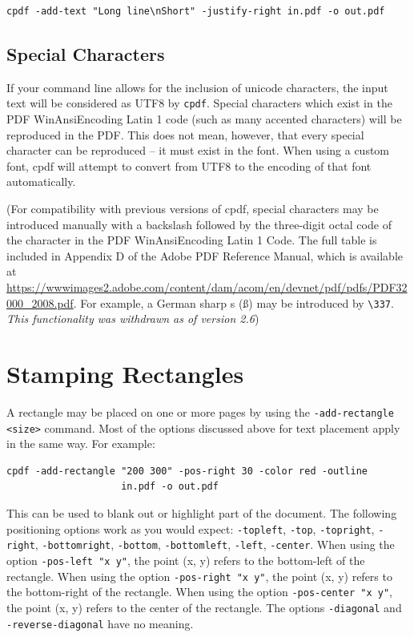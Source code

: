 \documentclass{book}
\begin{document}
\begin{framed}
  \noindent\small\begin{verbatim}cpdf -add-text "Long line\nShort" -justify-right in.pdf -o out.pdf\end{verbatim}
\end{framed}

\subsection{Special Characters}

If your command line allows for the inclusion of unicode characters, the input
text will be considered as UTF8 by \verb!cpdf!. Special characters which exist
in the PDF WinAnsiEncoding Latin 1 code (such as many accented characters) will
be reproduced in the PDF. This does not mean, however, that every special
character can be reproduced -- it must exist in the font. When using a custom font, cpdf will attempt to convert from UTF8 to the encoding of that font automatically.

(For compatibility with previous versions of cpdf, special characters may be
introduced manually with a backslash followed by the three-digit octal code of
the character in the PDF WinAnsiEncoding Latin 1 Code. The full table is
included in Appendix D of the Adobe PDF Reference Manual, which is available at
\url{https://wwwimages2.adobe.com/content/dam/acom/en/devnet/pdf/pdfs/PDF32000_2008.pdf}. For example, a German sharp s (\ss) may be introduced by \verb!\337!. \textit{This functionality was withdrawn as of version 2.6})

\section{Stamping Rectangles}

A rectangle may be placed on one or more pages by using the \texttt{-add-rectangle <size>} command. Most of the options discussed above for text placement apply in the same way. For example:

\begin{framed}
  \small\begin{verbatim}cpdf -add-rectangle "200 300" -pos-right 30 -color red -outline
                    in.pdf -o out.pdf\end{verbatim}
\end{framed}

\noindent This can be used to blank out or highlight part of the document. The following positioning options work as you would expect: \texttt{-topleft}, \texttt{-top}, \texttt{-topright}, \texttt{-right}, \texttt{-bottomright}, \texttt{-bottom}, \texttt{-bottomleft}, \texttt{-left}, \texttt{-center}. When using the option \texttt{-pos-left "x y"}, the point (x, y) refers to the bottom-left of the rectangle. When using the option \texttt{-pos-right "x y"}, the point (x, y) refers to the bottom-right of the rectangle. When using the option \texttt{-pos-center "x y"}, the point (x, y) refers to the center of the rectangle. The options \texttt{-diagonal} and \texttt{-reverse-diagonal} have no meaning.
\end{document}
